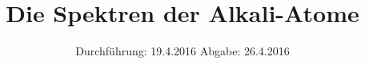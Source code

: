 

\subject{V605}
\title{Die Spektren der Alkali-Atome}
\date{
  Durchführung: 19.4.2016
  \hspace{3em}
  Abgabe: 26.4.2016
}



\maketitle
\thispagestyle{empty}
\tableofcontents
\newpage








\printbibliography


